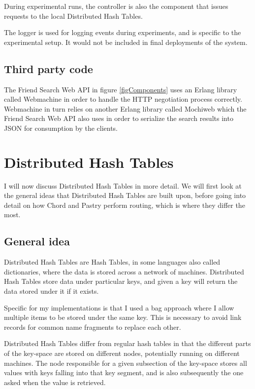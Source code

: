 During experimental runs, the controller is also the component that issues requests to the local Distributed Hash Tables.

The logger is used for logging events during experiments, and is specific to the experimental setup. It would not be included in final deployments of the system.

\subsection{Third party code}
The Friend Search Web API in figure \ref{figComponents} uses an Erlang library called Webmachine in order to handle the HTTP negotiation process correctly. Webmachine in turn relies on another Erlang library called Mochiweb which the Friend Search Web API also uses in order to serialize the search results into JSON for consumption by the clients.

\section{Distributed Hash Tables}
I will now discuss Distributed Hash Tables in more detail. We will first look at the general ideas that Distributed Hash Tables are built upon, before going into detail on how Chord and Pastry perform routing, which is where they differ the most.

\subsection{General idea}
Distributed Hash Tables are Hash Tables, in some languages also called dictionaries, where the data is stored across a network of machines. Distributed Hash Tables store data under particular keys, and given a key will return the data stored under it if it exists.

Specific for my implementations is that I used a bag approach where I allow multiple items to be stored under the same key. This is necessary to avoid link records for common name fragments to replace each other.

Distributed Hash Tables differ from regular hash tables in that the different parts of the key-space are stored on different nodes, potentially running on different machines. The node responsible for a given subsection of the key-space stores all values with keys falling into that key segment, and is also subsequently the one asked when the value is retrieved.

